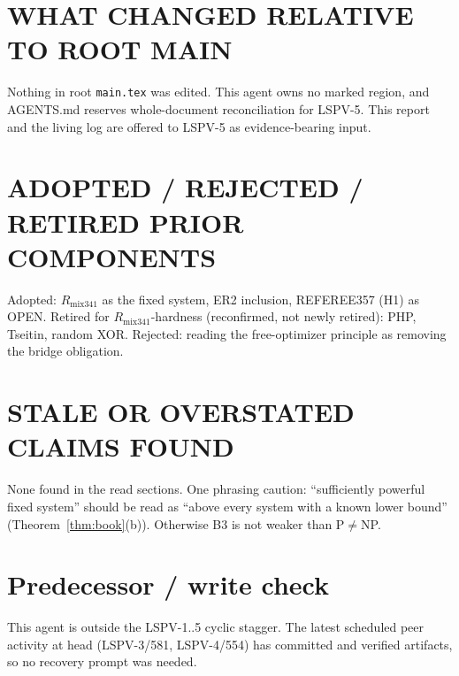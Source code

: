 \documentclass[11pt]{article}
\theoremstyle{definition}
\newcommand{\Rm}{R_{\mathrm{mix341}}}
\begin{document}
\section*{WHAT CHANGED RELATIVE TO ROOT MAIN}
Nothing in root \texttt{main.tex} was edited. This agent owns no marked
region, and AGENTS.md reserves whole-document reconciliation for LSPV-5.
This report and the living log
 are offered to
LSPV-5 as evidence-bearing input.

\section*{ADOPTED / REJECTED / RETIRED PRIOR COMPONENTS}
Adopted: $\Rm$ as the fixed system, ER2 inclusion, REFEREE357 (H1) as OPEN.
Retired for $\Rm$-hardness (reconfirmed, not newly retired): PHP, Tseitin,
random XOR. Rejected: reading the free-optimizer principle as removing the
bridge obligation.

\section*{STALE OR OVERSTATED CLAIMS FOUND}
None found in the read sections. One phrasing caution: ``sufficiently
powerful fixed system'' should be read as ``above every system with a known
lower bound'' (Theorem~\ref{thm:book}(b)). Otherwise B3 is not weaker than
P$\ne$NP.

\section*{Predecessor / write check}
This agent is outside the LSPV-1..5 cyclic stagger. The latest scheduled
peer activity at head (LSPV-3/581, LSPV-4/554) has committed and verified
artifacts, so no recovery prompt was needed.
\end{document}
